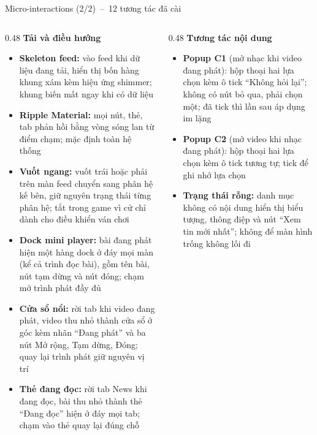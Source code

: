 \documentclass[aspectratio=169]{beamer}
\begin{document}
\begin{frame}{Micro-interactions (2/2)~--~12 tương tác đã cài}
  \begin{columns}
    \begin{column}{0.48\textwidth}
      {\scriptsize\textbf{Tải và điều hướng}}\vspace{1mm}
      {\tiny
      \begin{itemize}\itemsep2.5pt
        \item \textbf{Skeleton feed:} vào feed khi dữ liệu đang tải, hiển thị bốn hàng khung xám kèm hiệu ứng shimmer; khung biến mất ngay khi có dữ liệu
        \item \textbf{Ripple Material:} mọi nút, thẻ, tab phản hồi bằng vòng sóng lan từ điểm chạm; mặc định toàn hệ thống
        \item \textbf{Vuốt ngang:} vuốt trái hoặc phải trên màn feed chuyển sang phân hệ kế bên, giữ nguyên trạng thái từng phân hệ; tắt trong game vì cử chỉ dành cho điều khiển ván chơi
        \item \textbf{Dock mini player:} bài đang phát hiện một hàng dock ở đáy mọi màn (kể cả trình đọc bài), gồm tên bài, nút tạm dừng và nút đóng; chạm mở trình phát đầy đủ
        \item \textbf{Cửa sổ nổi:} rời tab khi video đang phát, video thu nhỏ thành cửa sổ ở góc kèm nhãn ``Đang phát'' và ba nút Mở rộng, Tạm dừng, Đóng; quay lại trình phát giữ nguyên vị trí
        \item \textbf{Thẻ đang đọc:} rời tab News khi đang đọc, bài thu nhỏ thành thẻ ``Đang đọc'' hiện ở đáy mọi tab; chạm vào thẻ quay lại đúng chỗ
      \end{itemize}}
    \end{column}
    \begin{column}{0.48\textwidth}
      {\scriptsize\textbf{Tương tác nội dung}}\vspace{1mm}
      {\tiny
      \begin{itemize}\itemsep2.5pt
        \item \textbf{Popup C1} (mở nhạc khi video đang phát): hộp thoại hai lựa chọn kèm ô tick ``Không hỏi lại''; không có nút bỏ qua, phải chọn một; đã tick thì lần sau áp dụng im lặng
        \item \textbf{Popup C2} (mở video khi nhạc đang phát): hộp thoại hai lựa chọn kèm ô tick tương tự; tick để ghi nhớ lựa chọn
        \item \textbf{Trạng thái rỗng:} danh mục không có nội dung hiển thị biểu tượng, thông điệp và nút ``Xem tin mới nhất''; không để màn hình trống không lối đi

\end{itemize}}
\end{column}
\end{columns}
\end{frame}
\end{document}

